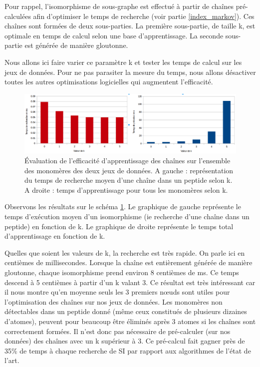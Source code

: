 Pour rappel, l'isomorphisme de sous-graphe est effectué à partir de chaînes pré-calculées afin d'optimiser le temps de recherche (voir partie \ref{index_markov}).
Ces chaînes sont formées de deux sous-parties.
La première sous-partie, de taille k, est optimale en temps de calcul selon une base d'apprentissage.
La seconde sous-partie est générée de manière gloutonne.

Nous allons ici faire varier ce paramètre k et tester les temps de calcul sur les jeux de données.
Pour ne pas parasiter la mesure du temps, nous allons désactiver toutes les autres optimisations logicielles qui augmentent l'efficacité.

\begin{figure}[!ht]
  \begin{center}
    \includegraphics[width=450px]{Figures/s2m/results/k.png}
    \caption{\label{k_graph}Évaluation de l'efficacité d'apprentissage des chaînes sur l'ensemble des monomères des deux jeux de données.
    A gauche : représentation du temps de recherche moyen d'une chaîne dans un peptide selon k.
    A droite : temps d'apprentissage pour tous les monomères selon k.}
  \end{center}
\end{figure}

Observons les résultats sur le schéma \ref{k_graph}.
Le graphique de gauche représente le temps d'exécution moyen d'un isomorphisme (ie recherche d'une chaîne dans un peptide) en fonction de k.
Le graphique de droite représente le temps total d'apprentissage en fonction de k.

Quelles que soient les valeurs de k, la recherche est très rapide.
On parle ici en centièmes de millisecondes.
Lorsque la chaîne est entièrement générée de manière gloutonne, chaque isomorphisme prend environ 8 centièmes de ms.
Ce temps descend à 5 centièmes à partir d'un k valant 3.
Ce résultat est très intéressant car il nous montre qu'en moyenne seuls les 3 premiers n\oe{}uds sont utiles pour l'optimisation des chaînes sur nos jeux de données.
Les monomères non détectables dans un peptide donné (même ceux constitués de plusieurs dizaines d'atomes), peuvent pour beaucoup être éliminés après 3 atomes si les chaînes sont correctement formées.
Il n'est donc pas nécessaire de pré-calculer (sur nos données) des chaînes avec un k supérieur à 3.
Ce pré-calcul fait gagner près de 35\% de temps à chaque recherche de SI par rapport aux algorithmes de l'état de l'art.


